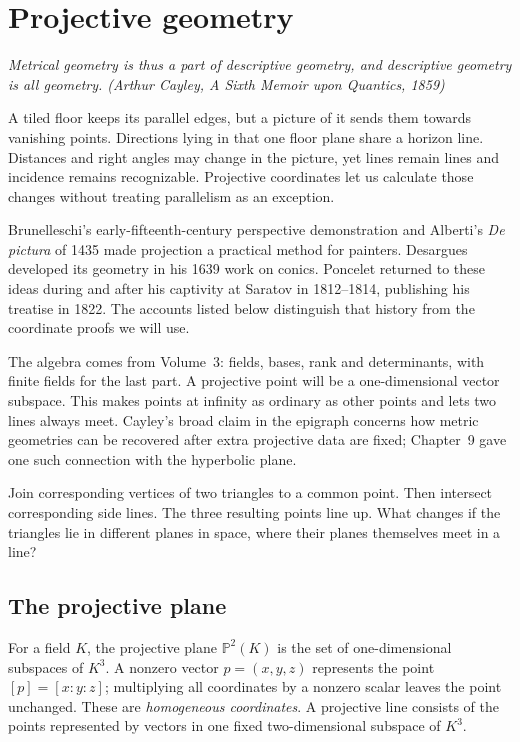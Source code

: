 \chapter{Projective geometry}\label{geometry:ch:projective}

\begin{center}\itshape
Metrical geometry is thus a part of descriptive geometry, and descriptive geometry is all geometry.
\upshape(Arthur Cayley, \emph{A Sixth Memoir upon Quantics}, 1859)
\end{center}

A tiled floor keeps its parallel edges, but a picture of it sends them towards vanishing points. Directions lying in that one floor plane share a horizon line. Distances and right angles may change in the picture, yet lines remain lines and incidence remains recognizable. Projective coordinates let us calculate those changes without treating parallelism as an exception.

Brunelleschi's early-fifteenth-century perspective demonstration and Alberti's \emph{De pictura} of 1435 made projection a practical method for painters. Desargues developed its geometry in his 1639 work on conics. Poncelet returned to these ideas during and after his captivity at Saratov in 1812--1814, publishing his treatise in 1822. The accounts listed below distinguish that history from the coordinate proofs we will use.

The algebra comes from Volume~3: fields, bases, rank and determinants, with finite fields for the last part. A projective point will be a one-dimensional vector subspace. This makes points at infinity as ordinary as other points and lets two lines always meet. Cayley's broad claim in the epigraph concerns how metric geometries can be recovered after extra projective data are fixed; Chapter~9 gave one such connection with the hyperbolic plane.

\begin{think}
Join corresponding vertices of two triangles to a common point. Then intersect corresponding side lines. The three resulting points line up. What changes if the triangles lie in different planes in space, where their planes themselves meet in a line?
\end{think}

\section{The projective plane}

\begin{definition}\label{geometry:def:projplane}
For a field $K$, the projective plane $\mathbb P^2(K)$ is the set of one-dimensional subspaces of $K^3$. A nonzero vector $p=(x,y,z)$ represents the point $[p]=[x:y:z]$; multiplying all coordinates by a nonzero scalar leaves the point unchanged. These are \emph{homogeneous coordinates}. A projective line consists of the points represented by vectors in one fixed two-dimensional subspace of $K^3$.
\end{definition}

